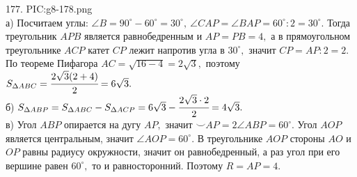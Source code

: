 177. {{PIC:g8-178.png}}\\
а) Посчитаем углы: $\angle B=90^\circ-60^\circ=30^\circ,\ \angle CAP=\angle BAP=60^\circ:2=30^\circ.$ Тогда треугольник $APB$ является равнобедренным и $AP=PB=4,$ а в прямоугольном треугольнике $ACP$ катет $CP$ лежит напротив угла в $30^\circ,$ значит $CP=AP:2=2.$ По теореме Пифагора $AC=\sqrt{16-4}=2\sqrt{3},$ поэтому $S_{\Delta ABC}=\cfrac{2\sqrt{3}(2+4)}{2}=6\sqrt{3}.$\\
б) $S_{\Delta ABP}=S_{\Delta ABC}-S_{\Delta ACP}=6\sqrt{3}-\cfrac{2\sqrt{3}\cdot2}{2}=4\sqrt{3}.$\\
в) Угол $ABP$ опирается на дугу $AP,$ значит $\smile AP=2\angle ABP=60^\circ.$ Угол $AOP$ является центральным, значит $\angle AOP=60^\circ.$ В треугольнике $AOP$ стороны $AO$ и $OP$ равны радиусу окружности, значит он равнобедренный, а раз угол при его вершине равен $60^\circ,$ то и равносторонний. Поэтому $R=AP=4.$\\
